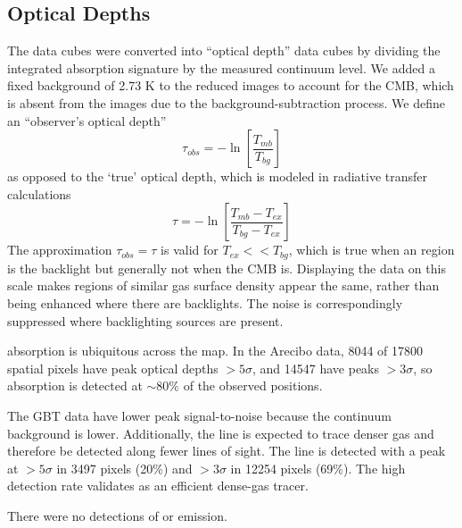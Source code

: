 \subsection{Optical Depths}

The data cubes were converted into ``optical depth'' data cubes by dividing the
integrated \formaldehyde absorption signature by the measured continuum level.
We added a fixed background of 2.73 K to the reduced images to account for the
CMB, which is absent from the images due to the background-subtraction
process.  We define an ``observer's optical depth''
\begin{equation}
    \tau_{obs} = -\ln\left[\frac{T_{mb}}{T_{bg}}\right]
\end{equation}
as opposed to the `true' optical depth, which is modeled in radiative transfer
calculations
\begin{equation}
    \tau = -\ln\left[\frac{T_{mb}-T_{ex}}{T_{bg}-T_{ex}}\right]
\end{equation}
The approximation $\tau_{obs} = \tau$ is valid for $T_{ex} << T_{bg}$, which is
true when an \hii region is the backlight but generally not when the CMB is.
Displaying the data on this scale makes regions of similar gas surface density
appear the same, rather than being enhanced where there are backlights.  The
noise is correspondingly suppressed where backlighting sources are present.


\formaldehyde absorption is ubiquitous across the map.  In the Arecibo data,
8044 of 17800 spatial pixels have peak optical depths $>5\sigma$, and 14547
have peaks $>3\sigma$, so \formaldehyde absorption is detected at $\sim80\%$ of
the observed positions.

The GBT \formaldehyde \twotwo data have lower peak signal-to-noise because the
continuum background is lower.  Additionally, the \twotwo line is expected to
trace denser gas and therefore be detected along fewer lines of sight.  The
\twotwo line is detected with a peak at $>5\sigma$ in 3497 pixels (20\%) and
$>3\sigma$ in 12254 pixels (69\%).  The high detection rate validates
\formaldehyde as an efficient dense-gas tracer.

There were no detections of \formaldehyde \oneone or \twotwo emission.


